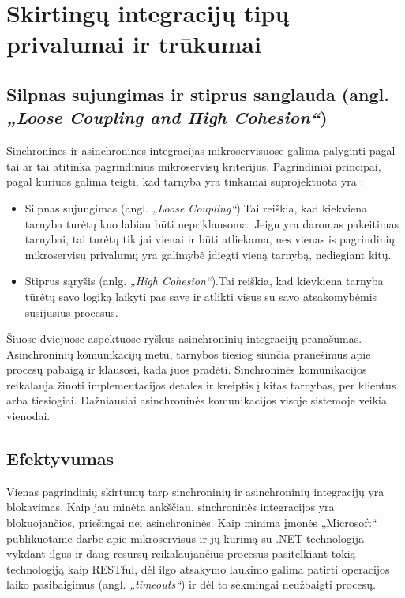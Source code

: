 \section{Skirtingų integracijų tipų privalumai ir trūkumai}


\subsection{Silpnas sujungimas ir stiprus sanglauda (angl. \textit{„Loose Coupling and High Cohesion“})}
Sinchronines ir asinchronines integracijas mikroservisuose galima palyginti pagal tai ar tai atitinka pagrindinius mikroservisų
kriterijus. Pagrindiniai principai, pagal kuriuos galima teigti, kad tarnyba yra tinkamai suprojektuota yra \cite{Bk2}:

\begin{itemize}
  \item Silpnas sujungimas (angl. \textit{„Loose Coupling“}).Tai reiškia, kad kiekviena tarnyba turėtų kuo labiau būti nepriklausoma. Jeigu yra daromas pakeitimas tarnybai, tai turėtų
  tik jai vienai ir būti atliekama, nes vienas is pagrindinių mikroservisų privalumų yra galimybė įdiegti vieną tarnybą, nediegiant kitų.
  \item Stiprus sąryšis (anlg. \textit{„High Cohesion“}).Tai reiškia, kad kievkiena tarnyba tūrėtų savo logiką laikyti 
  pas save ir atlikti visus su savo atsakomybėmis susijusius procesus.
\end{itemize}

Šiuose dviejuose aspektuose ryškus asinchroninių integracijų pranašumas. Asinchroninių komunikacijų metu, tarnybos tiesiog siunčia pranešimus apie procesų pabaigą ir 
klausosi, kada juos pradėti. Sinchroninės komunikacijos reikalauja žinoti implementacijos detales ir kreiptis į kitas tarnybas, per klientus arba tiesiogiai.
Dažniausiai asinchroninės komunikacijos visoje sistemoje veikia vienodai.

\subsection{Efektyvumas}

Vienas pagrindinių skirtumų tarp sinchroninių ir asinchroninių integracijų yra blokavimas. Kaip jau minėta ankščiau,
sinchroninės integracijos yra blokuojančios, priešingai nei asinchroninės. Kaip minima įmonės „Microsoft“
publikuotame darbe apie mikroservisus ir jų kūrimą su .NET technologija \cite{Misc1} vykdant ilgus ir daug resursų reikalaujančius procesus
pasitelkiant tokią technologiją kaip RESTful, dėl ilgo atsakymo laukimo galima patirti operacijos laiko pasibaigimus (angl. \textit{„timeouts“})
ir dėl to sėkmingai neužbaigti procesų.

